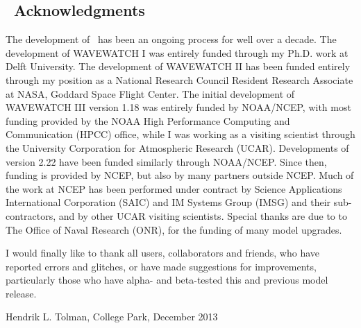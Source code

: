 \vssub
\subsection{~Acknowledgments}
\vssub

The development of \ws\ has been an ongoing process for well over a
decade. The development of WAVEWATCH I was entirely funded through my
Ph.D. work at Delft University. The development of WAVEWATCH II has been
funded entirely through my position as a National Research Council Resident
Research Associate at NASA, Goddard Space Flight Center. The initial
development of WAVEWATCH III version 1.18 was entirely funded by NOAA/NCEP,
with most funding provided by the NOAA High Performance Computing and
Communication (HPCC) office, while I was working as a visiting scientist
through the University Corporation for Atmospheric Research (UCAR).
Developments of version 2.22 have been funded similarly through NOAA/NCEP.
Since then, funding is provided by NCEP, but also by many partners outside
NCEP. Much of the work at NCEP has been performed under contract by Science
Applications International Corporation (SAIC) and IM Systems Group (IMSG) and
their sub-contractors, and by other UCAR visiting scientists.  Special thanks
are due to to The Office of Naval Research (ONR), for the funding of many
model upgrades.

I would finally like to thank all users, collaborators and friends, who have
reported errors and glitches, or have made suggestions for improvements,
particularly those who have alpha- and beta-tested this and previous model
release.

\vspace{\baselineskip}
\vspace{\baselineskip} 
\strut \hfill Hendrik L. Tolman, College Park, December 2013
